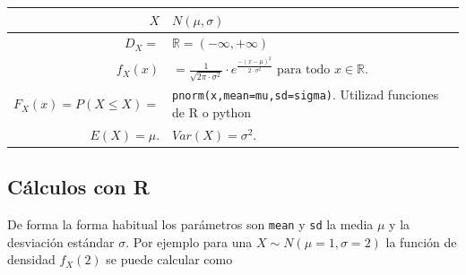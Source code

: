 \documentclass[]{book}
\begin{document}
\begin{longtable}[]{@{}rl@{}}
\toprule
\begin{minipage}[b]{0.38\columnwidth}\raggedleft
\(X\)\strut
\end{minipage} & \begin{minipage}[b]{0.56\columnwidth}\raggedright
\(N(\mu,\sigma)\)\strut
\end{minipage}\tabularnewline
\midrule
\endhead
\begin{minipage}[t]{0.38\columnwidth}\raggedleft
\(D_X=\)\strut
\end{minipage} & \begin{minipage}[t]{0.56\columnwidth}\raggedright
\(\mathbb{R}=(-\infty,+\infty)\)\strut
\end{minipage}\tabularnewline
\begin{minipage}[t]{0.38\columnwidth}\raggedleft
\(f_{X}(x)\)\strut
\end{minipage} & \begin{minipage}[t]{0.56\columnwidth}\raggedright
\(=\frac{1}{\sqrt{2\pi\cdot\sigma^2}}\cdot e^{\frac{-(x-\mu)^2}{2\cdot \sigma^2}}\mbox{ para todo }x\in \mathbb{R}.\)\strut
\end{minipage}\tabularnewline
\begin{minipage}[t]{0.38\columnwidth}\raggedleft
\(F_X(x)=P(X\leq X)=\)\strut
\end{minipage} & \begin{minipage}[t]{0.56\columnwidth}\raggedright
\texttt{pnorm(x,mean=mu,sd=sigma)}. Utilizad funciones de R o python\strut
\end{minipage}\tabularnewline
\begin{minipage}[t]{0.38\columnwidth}\raggedleft
\(E(X)=\mu.\)\strut
\end{minipage} & \begin{minipage}[t]{0.56\columnwidth}\raggedright
\(Var(X)=\sigma^2.\)\strut
\end{minipage}\tabularnewline
\bottomrule
\end{longtable}

\hypertarget{cuxe1lculos-con-r-16}{%
\subsection{Cálculos con R}\label{cuxe1lculos-con-r-16}}

De forma la forma habitual los parámetros son \texttt{mean} y \texttt{sd} la media \(\mu\) y la desviación estándar \(\sigma\). Por ejemplo para una \(X\sim N(\mu=1,\sigma=2)\) la función de densidad \(f_X(2)\) se puede calcular como
\end{document}
